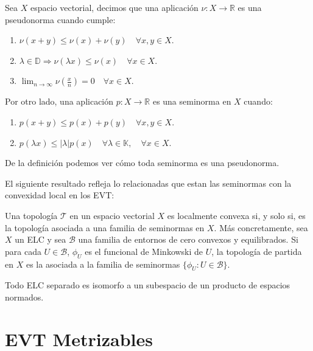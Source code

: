 \begin{definicion}
Sea $X$ espacio vectorial, decimos que una aplicación $\nu:X\rightarrow\mathds{R}$ es una pseudonorma cuando cumple: 
\begin{enumerate}
	\item $\nu (x+y) \leq \nu(x)+\nu (y)\quad \forall x,y \in X$.
	\item $\lambda \in \mathds{D} \Rightarrow \nu (\lambda x) \leq \nu (x)\quad \forall x\in X$.
	\item $\lim_{n\rightarrow \infty} \nu (\frac{x}{n}) = 0 \quad \forall x \in X$.
	
\end{enumerate}
Por otro lado, una aplicación $p:X\rightarrow\mathds{R}$ es una seminorma en $X$ cuando:
\begin{enumerate}
	\item $p(x+y) \leq p(x)+p(y)\quad \forall x,y \in X$.
	\item $p (\lambda x) \leq \vert \lambda \vert p(x)\quad \forall \lambda \in \mathds{K}, \quad \forall x\in X$.	
\end{enumerate}

De la definición podemos ver cómo toda seminorma es una pseudonorma.
\end{definicion}


El siguiente resultado refleja lo relacionadas que estan las seminormas con la convexidad local en los EVT: 

\begin{teorema}

Una topología $\mathcal{T}$ en un espacio vectorial $X$ es localmente convexa si, y solo si, es la topología asociada a una familia de seminormas en $X$. Más concretamente, sea $X$ un ELC y sea $\mathcal{B}$ una familia de entornos de cero convexos y equilibrados. Si para cada $U\in\mathcal{B}$, $\phi_{U}$ es el funcional de Minkowski de $U$, la topología de partida en $X$ es la asociada a la familia de seminormas $\{\phi_{U} : U\in\mathcal{B}\}$. 
\end{teorema}

\begin{corolario}
Todo ELC separado es isomorfo a un subespacio de un producto de espacios normados.
\end{corolario}
\section{EVT Metrizables}

